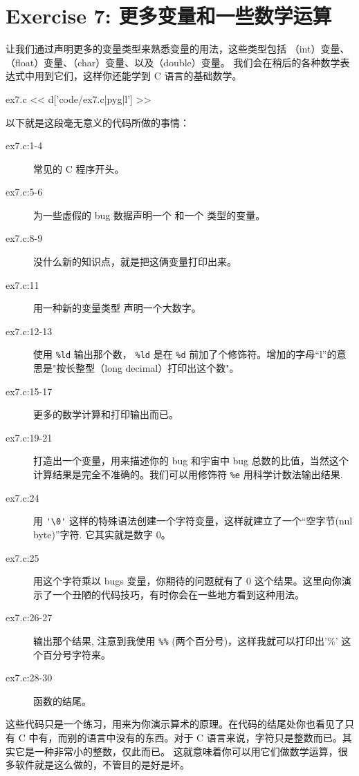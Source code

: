 \chapter{Exercise 7: 更多变量和一些数学运算}

让我们通过声明更多的变量类型来熟悉变量的用法，这些类型包括 （int）变量、（float）变量、（char）变量、以及（double）变量。 我们会在稍后的各种数学表达式中用到它们，这样你还能学到 C 语言的基础数学。

\begin{code}{ex7.c}
<< d['code/ex7.c|pyg|l'] >>
\end{code}

以下就是这段毫无意义的代码所做的事情：

\begin{description}
\item[ex7.c:1-4] 常见的 C 程序开头。
\item[ex7.c:5-6] 为一些虚假的 bug 数据声明一个  和一个  类型的变量。
\item[ex7.c:8-9] 没什么新的知识点，就是把这俩变量打印出来。
\item[ex7.c:11] 用一种新的变量类型  声明一个大数字。
\item[ex7.c:12-13] 使用 \verb|%ld| 输出那个数， \verb|%ld| 是在 \verb|%d| 前加了个修饰符。增加的字母“l”的意思是"按长整型（long decimal）打印出这个数"。
\item[ex7.c:15-17] 更多的数学计算和打印输出而已。
\item[ex7.c:19-21] 打造出一个变量，用来描述你的 bug 和宇宙中 bug 总数的比值，当然这个计算结果是完全不准确的。我们可以用修饰符 \verb|%e|  用科学计数法输出结果.
\item[ex7.c:24] 用 \verb|'\0'| 这样的特殊语法创建一个字符变量，这样就建立了一个“空字节(nul byte)”字符.  它其实就是数字 0。
\item[ex7.c:25] 用这个字符乘以 bugs 变量，你期待的问题就有了 0 这个结果。这里向你演示了一个丑陋的代码技巧，有时你会在一些地方看到这种用法。
\item[ex7.c:26-27] 输出那个结果, 注意到我使用 \verb|%%| (两个百分号)，这样我就可以打印出'\%' 这个百分号字符来。
\item[ex7.c:28-30]  函数的结尾。
\end{description}

这些代码只是一个练习，用来为你演示算术的原理。在代码的结尾处你也看见了只有 C 中有，而别的语言中没有的东西。对于 C 语言来说，字符只是整数而已。其实它是一种非常小的整数，仅此而已。 这就意味着你可以用它们做数学运算，很多软件就是这么做的，不管目的是好是坏。

